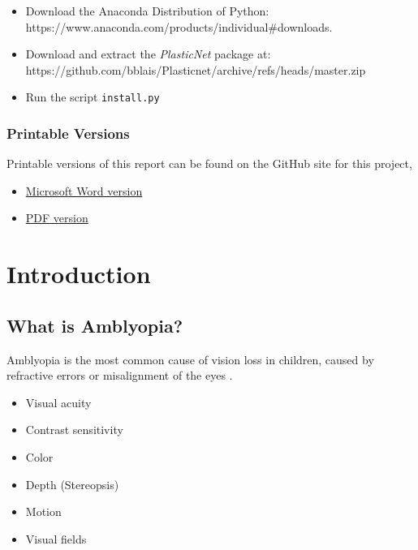 \documentclass[
  letterpaper,
  number]{elsarticle}
\providecommand{\tightlist}{%
  \setlength{\itemsep}{0pt}\setlength{\parskip}{0pt}}\usepackage{longtable,booktabs,array}
\begin{document}
\begin{itemize}
\tightlist
\item
  Download the Anaconda Distribution of Python:
  https://www.anaconda.com/products/individual\#downloads.\\
\item
  Download and extract the \emph{PlasticNet} package at:
  https://github.com/bblais/Plasticnet/archive/refs/heads/master.zip
\item
  Run the script \texttt{install.py}
\end{itemize}

\hypertarget{printable-versions}{%
\section*{Printable Versions}\label{printable-versions}}

Printable versions of this report can be found on the GitHub site for
this project,

\begin{itemize}
\tightlist
\item
  \href{https://github.com/bblais/Amblyopia-Simulation/raw/main/docs/Comparing-Treatments-for-Amblyopia-with-a-Synaptic-Plasticity-Model.docx}{Microsoft
  Word version}
\item
  \href{https://github.com/bblais/Amblyopia-Simulation/raw/main/docs/Comparing-Treatments-for-Amblyopia-with-a-Synaptic-Plasticity-Model.pdf}{PDF
  version}
\end{itemize}

\part{Introduction}

\hypertarget{what-is-amblyopia}{%
\chapter{What is Amblyopia?}\label{what-is-amblyopia}}

Amblyopia is the most common cause of vision loss in children, caused by
refractive errors or misalignment of the eyes \citep{de2007current}.

\begin{itemize}
\tightlist
\item
  Visual acuity
\item
  Contrast sensitivity
\item
  Color
\item
  Depth (Stereopsis)
\item
  Motion
\item
  Visual fields
\end{itemize}
\end{document}
